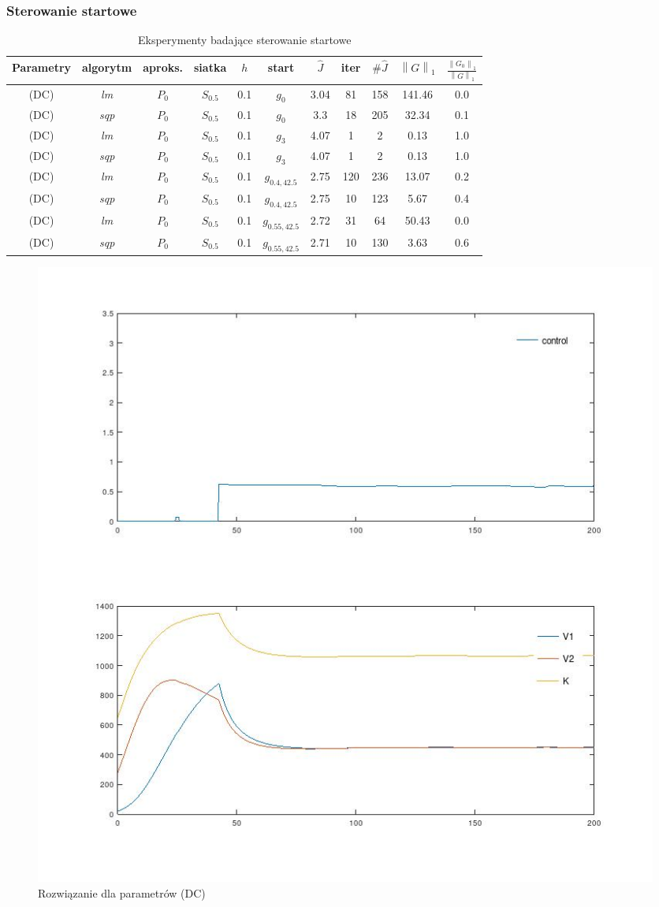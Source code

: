 \documentclass[11pt]{article}
\newcommand{\norm}[1]{\left\lVert#1\right\rVert}
\begin{document}
\subsubsection{Sterowanie startowe}

\begin{table}[h]
  \begin{center}
    \begin{tabular}{|c|c|c|c|c|c|c|c|c|c|c|}
      \hline
      Parametry & algorytm & aproks. & siatka & $h$ & start & $\hat{J}$ & iter & $\#\hat{J}$ & $\norm{G}_1$ & $\frac{\norm{G_0}_1}{\norm{G}_1}$ \\
      \hline
      (DC) & {\it lm\/} & $P_0$ & $S_{0.5}$ & 0.1 & $g_0$ & 3.04 & 81 & 158 & 141.46 & 0.0 \\
      \hline
      (DC) & {\it sqp\/} & $P_0$ & $S_{0.5}$ & 0.1 & $g_0$ & 3.3 & 18 & 205 & 32.34 & 0.1 \\
      \hline
      (DC) & {\it lm\/} & $P_0$ & $S_{0.5}$ & 0.1 & $g_3$ & 4.07 & 1 & 2 & 0.13 & 1.0 \\
      \hline
      (DC) & {\it sqp\/} & $P_0$ & $S_{0.5}$ & 0.1 & $g_3$ & 4.07 & 1 & 2 & 0.13 & 1.0 \\
      \hline
      (DC) & {\it lm\/} & $P_0$ & $S_{0.5}$ & 0.1 & $g_{0.4,42.5}$ & 2.75 & 120 & 236 & 13.07 & 0.2 \\
      \hline
      (DC) & {\it sqp\/} & $P_0$ & $S_{0.5}$ & 0.1 & $g_{0.4,42.5}$ & 2.75 & 10 & 123 & 5.67 & 0.4 \\
      \hline
      (DC) & {\it lm\/} & $P_0$ & $S_{0.5}$ & 0.1 & $g_{0.55,42.5}$ & 2.72 & 31 & 64 & 50.43 & 0.0 \\
      \hline
      (DC) & {\it sqp\/} & $P_0$ & $S_{0.5}$ & 0.1 & $g_{0.55,42.5}$ & 2.71 & 10 & 130 & 3.63 & 0.6 \\
      \hline
    \end{tabular}
    \caption{Eksperymenty badające sterowanie startowe}\label{start_tbl}
  \end{center}
\end{table}

\begin{figure}[h]
  \centering
  \includegraphics[width=.5\textwidth]{../plots/plot_param2_best}
  \caption{Rozwiązanie dla parametrów (DC)}\label{param2_best_sol}
\end{figure}
\end{document}
